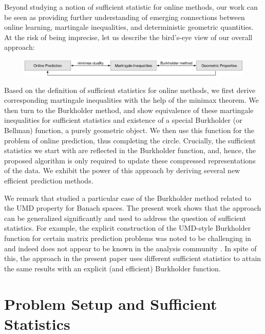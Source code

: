 Beyond studying a notion of sufficient statistic for online methods, our work can be seen as providing further understanding of emerging connections between online learning, martingale inequalities, and deterministic geometric quantities. At the risk of being imprecise, let us describe the bird's-eye view of our overall approach:
\begin{figure}[H]
	\label{fig:high_level_equiv}
  \centering
    \includegraphics[width=\textwidth]{equivalence2.pdf}
	\vspace{-9mm}
\end{figure}
Based on the definition of sufficient statistics for online methods, we first derive corresponding martingale inequalities with the help of the minimax theorem. We then turn to the Burkholder method, and show equivalence of these martingale inequalities for sufficient statistics and existence of a special Burkholder (or Bellman) function, a purely geometric object. We then use this function for the problem of online prediction, thus completing the circle. Crucially, the sufficient statistics we start with are reflected in the Burkholder function, and, hence, the proposed algorithm is only required to update these compressed representations of the data. We exhibit the power of this approach by deriving several new efficient prediction methods.

We remark that \citep{foster2017zigzag} studied a particular case of the Burkholder method related to the UMD property for Banach spaces. The present work shows that the approach can be generalized significantly and used to address the question of sufficient statistics. For example, the explicit construction of the UMD-style Burkholder function for certain matrix prediction problems was noted to be challenging in \citep{foster2017zigzag} and indeed does not appear to be known in the analysis community \citep{osekowski2017personal}. In spite of this, the approach in the present paper uses different sufficient statistics to attain the same results with an explicit (and efficient) Burkholder function.

\section{Problem Setup and Sufficient Statistics}
\label{sec:problem}

